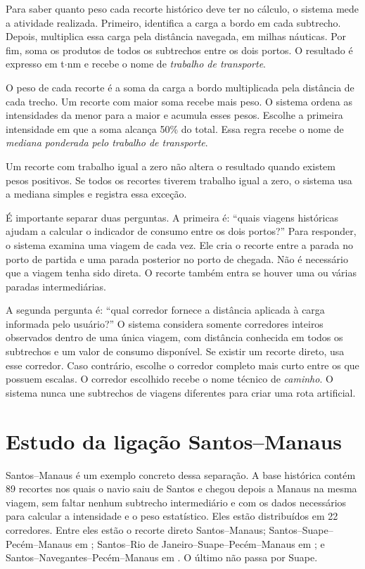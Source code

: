Para saber quanto peso cada recorte histórico deve ter no cálculo, o sistema mede a atividade realizada. Primeiro, identifica a carga a bordo em cada subtrecho. Depois, multiplica essa carga pela distância navegada, em milhas náuticas. Por fim, soma os produtos de todos os subtrechos entre os dois portos. O resultado é expresso em t$\cdot$nm e recebe o nome de \emph{trabalho de transporte}.

O peso de cada recorte é a soma da carga a bordo multiplicada pela distância de cada trecho. Um recorte com maior soma recebe mais peso. O sistema ordena as intensidades da menor para a maior e acumula esses pesos. Escolhe a primeira intensidade em que a soma alcança 50\% do total. Essa regra recebe o nome de \emph{mediana ponderada pelo trabalho de transporte}.

Um recorte com trabalho igual a zero não altera o resultado quando existem pesos positivos. Se todos os recortes tiverem trabalho igual a zero, o sistema usa a mediana simples e registra essa exceção.

É importante separar duas perguntas. A primeira é: ``quais viagens históricas ajudam a calcular o indicador de consumo entre os dois portos?'' Para responder, o sistema examina uma viagem de cada vez. Ele cria o recorte entre a parada no porto de partida e uma parada posterior no porto de chegada. Não é necessário que a viagem tenha sido direta. O recorte também entra se houver uma ou várias paradas intermediárias.

A segunda pergunta é: ``qual corredor fornece a distância aplicada à carga informada pelo usuário?'' O sistema considera somente corredores inteiros observados dentro de uma única viagem, com distância conhecida em todos os subtrechos e um valor de consumo disponível. Se existir um recorte direto, usa esse corredor. Caso contrário, escolhe o corredor completo mais curto entre os que possuem escalas. O corredor escolhido recebe o nome técnico de \emph{caminho}. O sistema nunca une subtrechos de viagens diferentes para criar uma rota artificial.

\section{Estudo da ligação Santos--Manaus}
\label{sec:santos-manaus-resultados}

Santos--Manaus é um exemplo concreto dessa separação. A base histórica contém 89 recortes nos quais o navio saiu de Santos e chegou depois a Manaus na mesma viagem, sem faltar nenhum subtrecho intermediário e com os dados necessários para calcular a intensidade e o peso estatístico. Eles estão distribuídos em 22 corredores. Entre eles estão o recorte direto Santos--Manaus; Santos--Suape--Pecém--Manaus em ; Santos--Rio de Janeiro--Suape--Pecém--Manaus em ; e Santos--Navegantes--Pecém--Manaus em . O último não passa por Suape.

